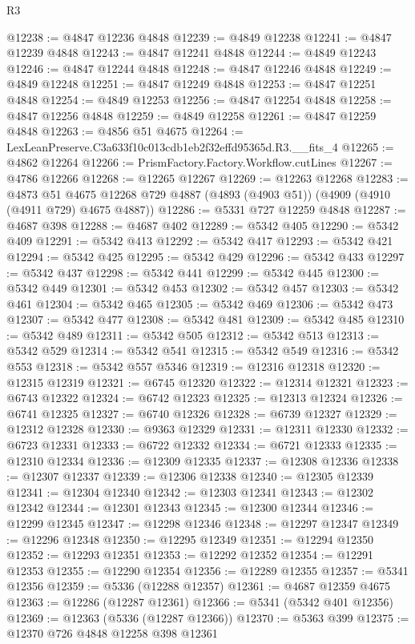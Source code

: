 \begin{lexlean}{R3}
\begin{coremodule}
@12238 := @4847 @12236 @4848
@12239 := @4849 @12238
@12241 := @4847 @12239 @4848
@12243 := @4847 @12241 @4848
@12244 := @4849 @12243
@12246 := @4847 @12244 @4848
@12248 := @4847 @12246 @4848
@12249 := @4849 @12248
@12251 := @4847 @12249 @4848
@12253 := @4847 @12251 @4848
@12254 := @4849 @12253
@12256 := @4847 @12254 @4848
@12258 := @4847 @12256 @4848
@12259 := @4849 @12258
@12261 := @4847 @12259 @4848
@12263 := @4856 @51 @4675
@12264 := LexLeanPreserve.C3a633f10c013cdb1eb2f32effd95365d.R3.__fits_4
@12265 := @4862 @12264
@12266 := PrismFactory.Factory.Workflow.cutLines
@12267 := @4786 @12266
@12268 := @12265 @12267
@12269 := @12263 @12268
@12283 := @4873
    @51
    @4675
    @12268
    @729
    @4887
    (@4893 (@4903 @51))
    (@4909 (@4910 (@4911 @729) @4675 @4887))
@12286 := @5331 @727 @12259 @4848
@12287 := @4687 @398
@12288 := @4687 @402
@12289 := @5342 @405
@12290 := @5342 @409
@12291 := @5342 @413
@12292 := @5342 @417
@12293 := @5342 @421
@12294 := @5342 @425
@12295 := @5342 @429
@12296 := @5342 @433
@12297 := @5342 @437
@12298 := @5342 @441
@12299 := @5342 @445
@12300 := @5342 @449
@12301 := @5342 @453
@12302 := @5342 @457
@12303 := @5342 @461
@12304 := @5342 @465
@12305 := @5342 @469
@12306 := @5342 @473
@12307 := @5342 @477
@12308 := @5342 @481
@12309 := @5342 @485
@12310 := @5342 @489
@12311 := @5342 @505
@12312 := @5342 @513
@12313 := @5342 @529
@12314 := @5342 @541
@12315 := @5342 @549
@12316 := @5342 @553
@12318 := @5342 @557 @5346
@12319 := @12316 @12318
@12320 := @12315 @12319
@12321 := @6745 @12320
@12322 := @12314 @12321
@12323 := @6743 @12322
@12324 := @6742 @12323
@12325 := @12313 @12324
@12326 := @6741 @12325
@12327 := @6740 @12326
@12328 := @6739 @12327
@12329 := @12312 @12328
@12330 := @9363 @12329
@12331 := @12311 @12330
@12332 := @6723 @12331
@12333 := @6722 @12332
@12334 := @6721 @12333
@12335 := @12310 @12334
@12336 := @12309 @12335
@12337 := @12308 @12336
@12338 := @12307 @12337
@12339 := @12306 @12338
@12340 := @12305 @12339
@12341 := @12304 @12340
@12342 := @12303 @12341
@12343 := @12302 @12342
@12344 := @12301 @12343
@12345 := @12300 @12344
@12346 := @12299 @12345
@12347 := @12298 @12346
@12348 := @12297 @12347
@12349 := @12296 @12348
@12350 := @12295 @12349
@12351 := @12294 @12350
@12352 := @12293 @12351
@12353 := @12292 @12352
@12354 := @12291 @12353
@12355 := @12290 @12354
@12356 := @12289 @12355
@12357 := @5341 @12356
@12359 := @5336 (@12288 @12357)
@12361 := @4687 @12359 @4675
@12363 := @12286 (@12287 @12361)
@12366 := @5341 (@5342 @401 @12356)
@12369 := @12363 (@5336 (@12287 @12366))
@12370 := @5363 @399
@12375 := @12370 @726 @4848 @12258 @398 @12361

\end{coremodule}
\end{lexlean}
